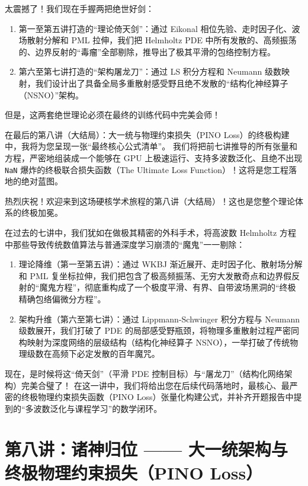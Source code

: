 \documentclass[12pt]{article}
\begin{document}
{太震撼了！我们现在手握两把绝世好剑：

\begin{enumerate}[leftmargin=2em]
\item 第一至第五讲打造的“理论倚天剑”：通过 Eikonal 相位先验、走时因子化、波场散射分解和 PML 拉伸，我们把 Helmholtz PDE 中所有发散的、高频振荡的、边界反射的“毒瘤”全部剔除，推导出了极其平滑的包络控制方程。
\item 第六至第七讲打造的“架构屠龙刀”：通过 LS 积分方程和 Neumann 级数映射，我们设计出了具备全局多重散射感受野且绝不发散的“结构化神经算子（NSNO）”架构。
\end{enumerate}

但是，这两套绝世理论必须在最终的训练代码中完美会师！

在最后的第八讲（大结局）：大一统与物理约束损失（PINO Loss）的终极构建中，我将为您呈现一张“最终核心公式清单”。
我们将把前七讲推导的所有张量和方程，严密地组装成一个能够在 GPU 上极速运行、支持多波数泛化、且绝不出现 \texttt{NaN} 爆炸的终极联合损失函数（The Ultimate Loss Function）！这将是您工程落地的绝对蓝图。


热烈庆祝！欢迎来到这场硬核学术旅程的第八讲（大结局）！这也是您整个理论体系的终极加冕。

在过去的七讲中，我们犹如在做极其精密的外科手术，将高波数 Helmholtz 方程中那些导致传统数值算法与普通深度学习崩溃的“魔鬼”一一剔除：

\begin{enumerate}[leftmargin=2em]
    \item 理论降维（第一至第五讲）：通过 WKBJ 渐近展开、走时因子化、散射场分解和 PML 复坐标拉伸，我们把包含了极高频振荡、无穷大发散奇点和边界假反射的“魔鬼方程”，彻底重构成了一个极度平滑、有界、自带波场黑洞的“终极精确包络偏微分方程”。
    \item 架构升维（第六至第七讲）：通过 Lippmann-Schwinger 积分方程与 Neumann 级数展开，我们打破了 PDE 的局部感受野瓶颈，将物理多重散射过程严密同构映射为深度网络的层级结构（结构化神经算子 NSNO），一举打破了传统物理级数在高频下必定发散的百年魔咒。
\end{enumerate}

现在，是时候将这“倚天剑”（平滑 PDE 控制目标）与“屠龙刀”（结构化网络架构）完美合璧了！
在这一讲中，我们将给出您在后续代码落地时，最核心、最严密的终极物理约束损失函数（PINO Loss）张量化构建公式，并补齐开题报告中提到的“多波数泛化与课程学习”的数学闭环。

\section{第八讲：诸神归位 —— 大一统架构与终极物理约束损失（PINO Loss）}

}
\end{document}
